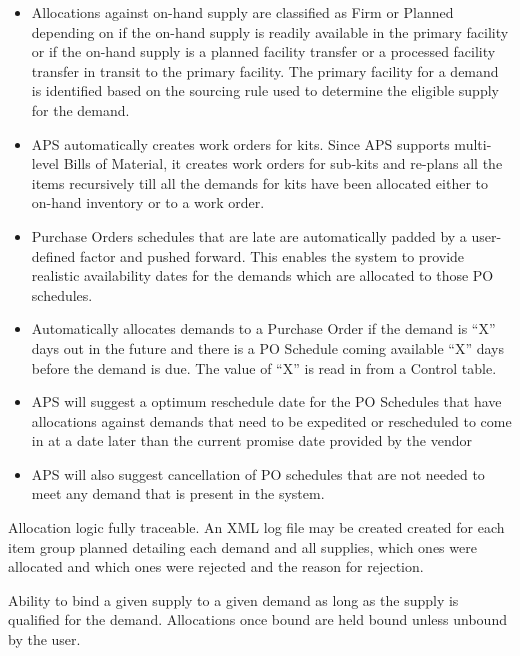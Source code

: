 \begin{itemize}
\item Allocations against on-hand supply are classified as Firm or Planned depending on if the on-hand supply is readily available in the primary facility or if the on-hand supply is a planned facility transfer or a processed facility transfer in transit to the primary facility. The primary facility for a demand is identified based on the sourcing rule used to determine the eligible supply for the demand.

\item APS automatically creates work orders for kits. Since APS supports multi-level Bills of Material, it creates work orders for sub-kits and re-plans all the items recursively till all the demands for kits have been allocated either to on-hand inventory or to a work order. 

\item Purchase Orders schedules that are late are automatically padded by a user-defined factor and pushed forward. This enables the system to provide realistic availability dates for the demands which are allocated to those PO schedules.

\item Automatically allocates demands to a Purchase Order if the demand is “X” days out in the future and there is a PO Schedule coming available “X” days before the demand is due. The value of “X” is read in from a Control table.

\item APS will suggest a optimum reschedule date for the PO Schedules that have allocations against demands that need to be expedited or rescheduled to come in at a date later than the current promise date provided by the vendor

\item APS will also suggest cancellation of PO schedules that are not needed to meet any demand that is present in the system.

\end{itemize}


Allocation logic fully traceable. An XML log file may be created created for each item group planned detailing each demand and all supplies, which ones were allocated and which ones were rejected and the reason for rejection.

Ability to bind a given supply to a given demand as long as the supply is qualified for the demand. Allocations once bound are held bound unless unbound by the user.

